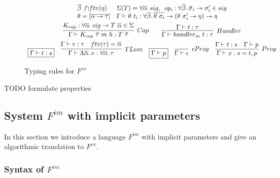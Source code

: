 \documentclass[acmsmall]{acmart}
\newcommand{\mathframebox}[1]{\framebox{$\displaystyle #1$}}
\newcommand{\ap}{~}
\begin{document}
\begin{figure}
\begin{gather*}
{\begin{array}{ll}
                \overline{\beta}\not\cap ftv(\eta) & %
                \Sigma(T) = \forall\overline{\alpha}\ldotp sig, \hspace{0.5em} op_i : \forall\overline{\beta}\ldotp \overline{\sigma}_i\to\sigma'_i \in sig
                \\
                \theta = [\overline{\alpha\to\tau}] &
                \Gamma\vdash\theta\ap t_i : \forall \overline{\beta}\ldotp \overline{\theta\ap\sigma_i}\to(\theta\ap\sigma_i'\to\eta)\to\eta
            \end{array}
        }\\
        \infer[Cap]{
            \Gamma\vdash K_{cap}\ap\overline{\tau}\ap m\ap h : T\ap\overline{\tau}
        }{
            K_{cap} : \forall\overline{\alpha}\ldotp sig\to T\ap\overline{\alpha} \in \Sigma
        } %
        \hspace{2em}
        \infer[Handler]{
            \Gamma\vdash handler_m ~t : \tau
        }{
            \Gamma\vdash t : \tau
        }\\
        \begin{array}{ccccc}
            \mathframebox{\Gamma\vdash t : s} &
            \infer[TLam]{
                \Gamma\vdash\Lambda\overline{\alpha}\ldotp v : \forall\overline{\alpha}\ldotp\tau
            }{
                \Gamma\vdash v : \tau & ftv(\tau) = \overline{\alpha}
            } &
            \mathframebox{\Gamma\vdash p} &
            \infer[\epsilon Prog]{\Gamma\vdash\epsilon}{} &
            \infer[Prog]{\Gamma\vdash x : s = t, p}{\Gamma\vdash t : s & \Gamma\vdash p}
        \end{array}
    \end{gather*}
    \caption{Typing rules for $F^{ex}$}
    \label{fig:fex-typing}
\end{figure}

TODO formulate properties %

\subsection{System $F^{im}$ with implicit parameters} \label{subsec:fim}

In this section we introduce a language $F^{im}$ with implicit parameters and give an algorithmic translation to $F^{ex}$.

\subsubsection{Syntax of $F^{im}$}
\end{document}
